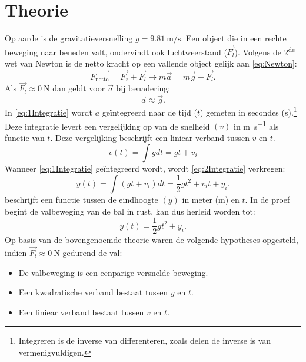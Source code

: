 \documentclass[•]{scrartcl}
\begin{document}
\section{Theorie}
Op aarde is de gravitatieversnelling $g=\SI{9.81}{\meter\per\second}$. Een object die in een rechte beweging naar beneden valt, ondervindt ook luchtweerstand ($\vec{F_{l}}$). Volgens de 2\textsuperscript{de} wet van Newton is de netto kracht op een vallende object gelijk aan \cref{eq:Newton}:
\begin{equation}\label{eq:Newton}
\vec{F_{\mathrm{netto}}}=\vec{F_{z}}+\vec{F_{l}} \rightarrow m\vec{a}=m\vec{g}+\vec{F_{l}}\mathrm{.}
\end{equation}
Als $\vec{F_{l}} \approx \SI{0}{\newton}$ dan geldt voor $\vec{a}$ bij benadering:
\begin{equation*}
\vec{a}\approx \vec{g}\mathrm{.}
\end{equation*}
In \cref{eq:1Integratie} wordt $a$ geïntegreerd naar de tijd ($t$) gemeten in secondes (\si{\second}).\footnote{Integreren is de inverse van differenteren, zoals delen de inverse is van vermenigvuldigen.} Deze integratie levert een vergelijking op van de snelheid $(v)$ in \si{\meter\per\second} als functie van $t$. Deze vergelijking beschrijft een liniear verband tussen $v$ en $t$. 
\begin{equation}\label{eq:1Integratie}
v(t)=\int g dt= gt + v_i
\end{equation}
Wanneer \cref{eq:1Integratie} ge\"{i}ntegreerd wordt, wordt \eqref{eq:2Integratie} verkregen:
\begin{equation}\label{eq:2Integratie}
y(t)=\int (gt + v_i)dt =\frac{1}{2}gt^2+v_{i}t+y_i\mathrm{.}
\end{equation}
 beschrijft een functie tussen de eindhoogte $(y)$ in meter (\si{\meter}) en $t$. In de proef begint de valbeweging van de bal in rust.  kan dus herleid worden tot:
\begin{equation*}
y(t)=\frac{1}{2}gt^2+y_i\mathrm{.}
\end{equation*}
Op basis van de bovengenoemde theorie waren de volgende hypotheses opgesteld, indien $\vec{F_{l}} \approx \SI{0}{\newton}$ gedurend de val:
\begin{itemize}
 \renewcommand{\labelitemi}{\scriptsize$\blacksquare$}
\item De valbeweging is een eenparige versnelde beweging.
\item Een kwadratische verband bestaat tussen $y$ en $t$.
\item Een liniear verband bestaat tussen $v$ en $t$.
\end{itemize}
%
\end{document}
